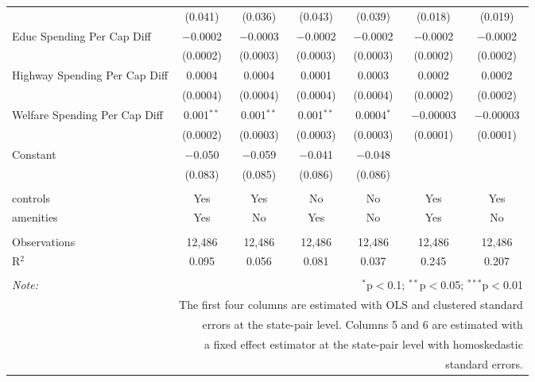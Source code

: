 \begin{table}[!htbp]
\begin{tabular}{@{\extracolsep{5pt}}lcccccc}
  & (0.041) & (0.036) & (0.043) & (0.039) & (0.018) & (0.019) \\ 
  Educ Spending Per Cap Diff & $-$0.0002 & $-$0.0003 & $-$0.0002 & $-$0.0002 & $-$0.0002 & $-$0.0002 \\ 
  & (0.0002) & (0.0003) & (0.0003) & (0.0003) & (0.0002) & (0.0002) \\ 
  Highway Spending Per Cap Diff & 0.0004 & 0.0004 & 0.0001 & 0.0003 & 0.0002 & 0.0002 \\ 
  & (0.0004) & (0.0004) & (0.0004) & (0.0004) & (0.0002) & (0.0002) \\ 
  Welfare Spending Per Cap Diff & 0.001$^{**}$ & 0.001$^{**}$ & 0.001$^{**}$ & 0.0004$^{*}$ & $-$0.00003 & $-$0.00003 \\ 
  & (0.0002) & (0.0003) & (0.0003) & (0.0003) & (0.0001) & (0.0001) \\ 
  Constant & $-$0.050 & $-$0.059 & $-$0.041 & $-$0.048 &  &  \\ 
  & (0.083) & (0.085) & (0.086) & (0.086) &  &  \\ 
 \hline \\[-1.8ex] 
controls & Yes & Yes & No & No & Yes & Yes \\ 
amenities & Yes & No & Yes & No & Yes & No \\ 
\hline \\[-1.8ex] 
Observations & 12,486 & 12,486 & 12,486 & 12,486 & 12,486 & 12,486 \\ 
R$^{2}$ & 0.095 & 0.056 & 0.081 & 0.037 & 0.245 & 0.207 \\ 
\hline 
\hline \\[-1.8ex] 
\textit{Note:}  & \multicolumn{6}{r}{$^{*}$p$<$0.1; $^{**}$p$<$0.05; $^{***}$p$<$0.01} \\ 
 & \multicolumn{6}{r}{The first four columns are estimated with OLS and clustered standard} \\ 
 & \multicolumn{6}{r}{ errors at the state-pair level. Columns 5 and 6 are estimated with} \\ 
 & \multicolumn{6}{r}{a fixed effect estimator at the state-pair level with homoskedastic} \\ 
 & \multicolumn{6}{r}{standard errors.} \\ 
\end{tabular} 
\end{table} 
